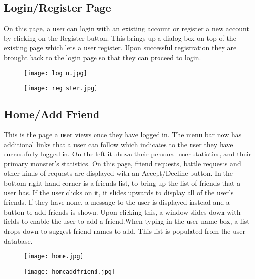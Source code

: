 \documentclass[titlepage]{article}
\begin{document}
\subsection{Login/Register Page}
On this page, a user can login with an existing account or register a new account by clicking on the Register button. This brings up a dialog box on top of the existing page which lets a user register. Upon successful registration they are brought back to the login page so that they can proceed to login.
\begin{figure}[h]
\begin{sideways}
\texttt{[image: login.jpg]}
\end{sideways}
\end{figure}
\newpage
\begin{figure}[h]
\begin{sideways}
\texttt{[image: register.jpg]}
\end{sideways}
\end{figure}
\newpage
\subsection{Home/Add Friend}This is the page a user views once they have logged in. The menu bar now has additional links that a user can follow which indicates to the user they have successfully logged in. On the left it shows their personal user statistics, and their primary monster's statistics. On this page, friend requests, battle requests and other kinds of requests are displayed with an Accept/Decline button. In the bottom right hand corner is a friends list, to bring up the list of friends that a user has. If the user clicks on it, it slides upwards to display all of the user's friends. If they have none, a message to the user is displayed instead and a button to add friends is shown. Upon clicking this, a window slides down with fields to enable the user to add a friend.When typing in the user name box, a list drops down to suggest friend names to add. This list is populated from the user database.
\begin{figure}[h]
\begin{sideways}
\texttt{[image: home.jpg]}
\end{sideways}
\end{figure}
\newpage
\begin{figure}[h]
\begin{sideways}
\texttt{[image: homeaddfriend.jpg]}
\end{sideways}
\end{figure}
\newpage
\end{document}
